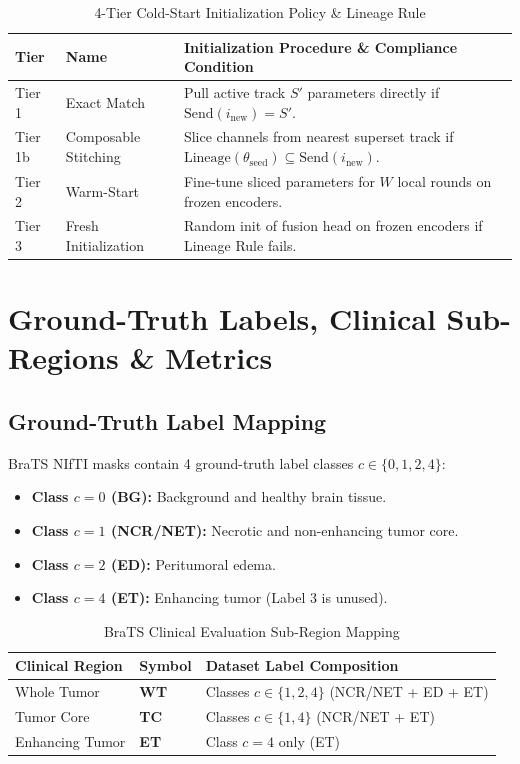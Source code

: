 \documentclass[11pt,a4paper]{article}
\begin{document}
\begin{table}[h!]
\centering
\caption{4-Tier Cold-Start Initialization Policy \& Lineage Rule}
\label{tab:coldstart}
\small
\begin{tabular}{@{}lll@{}}
\toprule
\textbf{Tier} & \textbf{Name} & \textbf{Initialization Procedure \& Compliance Condition} \\ \midrule
Tier 1 & Exact Match & Pull active track $S'$ parameters directly if $\text{Send}(i_{\text{new}}) = S'$. \\
Tier 1b & Composable Stitching & Slice channels from nearest superset track if $\text{Lineage}(\theta_{\text{seed}}) \subseteq \text{Send}(i_{\text{new}})$. \\
Tier 2 & Warm-Start & Fine-tune sliced parameters for $W$ local rounds on frozen encoders. \\
Tier 3 & Fresh Initialization & Random init of fusion head on frozen encoders if Lineage Rule fails. \\ \bottomrule
\end{tabular}
\end{table}

\newpage

\section{Ground-Truth Labels, Clinical Sub-Regions \& Metrics}

\subsection{Ground-Truth Label Mapping}
BraTS NIfTI masks contain 4 ground-truth label classes $c \in \{0, 1, 2, 4\}$:
\begin{itemize}
    \item \textbf{Class $c=0$ (BG):} Background and healthy brain tissue.
    \item \textbf{Class $c=1$ (NCR/NET):} Necrotic and non-enhancing tumor core.
    \item \textbf{Class $c=2$ (ED):} Peritumoral edema.
    \item \textbf{Class $c=4$ (ET):} Enhancing tumor (Label 3 is unused).
\end{itemize}

\begin{table}[h!]
\centering
\caption{BraTS Clinical Evaluation Sub-Region Mapping}
\label{tab:brats_regions}
\small
\begin{tabular}{@{}lll@{}}
\toprule
\textbf{Clinical Region} & \textbf{Symbol} & \textbf{Dataset Label Composition} \\ \midrule
Whole Tumor & \textbf{WT} & Classes $c \in \{1, 2, 4\}$ (NCR/NET + ED + ET) \\
Tumor Core & \textbf{TC} & Classes $c \in \{1, 4\}$ (NCR/NET + ET) \\
Enhancing Tumor & \textbf{ET} & Class $c=4$ only (ET) \\ \bottomrule
\end{tabular}
\end{table}
\end{document}

